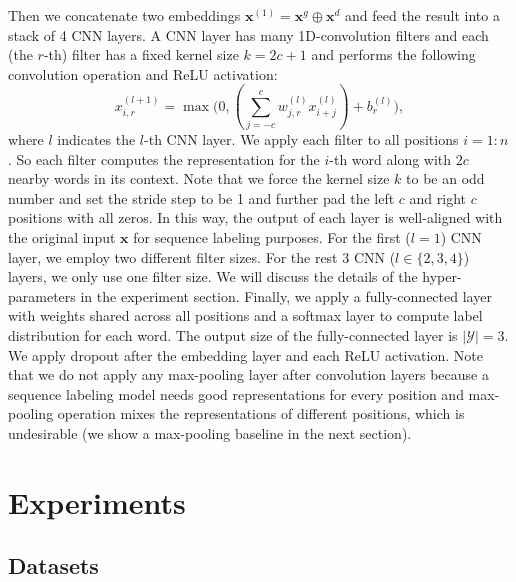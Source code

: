 \documentclass[11pt,a4paper]{article}
\begin{document}
Then we concatenate two embeddings $\mathbf{x}^{(1)}=\mathbf{x}^g \oplus \mathbf{x}^d$ and feed the result into a stack of 4 CNN layers. A CNN layer has many 1D-convolution filters and each (the $r$-th) filter has a fixed kernel size $k=2c+1$ and performs the following convolution operation and ReLU activation: 
\begin{equation}
x_{i,r}^{(l+1)}=\max\bigg(0, (\sum_{j=-c}^c w_{j,r}^{(l)} x_{i+j}^{(l)})+b_r^{(l)}\bigg),
\end{equation}
where $l$ indicates the $l$-th CNN layer. 
We apply each filter to all positions $i=1:n$.
So each filter computes the representation for the $i$-th word along with $2c$ nearby words in its context.  
Note that we force the kernel size $k$ to be an odd number and set the stride step to be 1 and further pad the left $c$ and right $c$ positions with all zeros.  
In this way, the output of each layer is well-aligned with the original input $\mathbf{x}$ for sequence labeling purposes.
For the first ($l=1$) CNN layer, we employ two different filter sizes. 
For the rest 3 CNN ($l \in \{2, 3, 4\}$) layers, we only use one filter size.
We will discuss the details of the hyper-parameters in the experiment section.
Finally, we apply a fully-connected layer with weights shared across all positions and a softmax layer to compute label distribution for each word.
The output size of the fully-connected layer is $|\mathcal{Y}|=3$.
We apply dropout after the embedding layer and each ReLU activation.
Note that we do not apply any max-pooling layer after convolution layers because a sequence labeling model needs good representations for every position and max-pooling operation mixes the representations of different positions, which is undesirable (we show a max-pooling baseline in the next section).

\section{Experiments}

\subsection{Datasets}
\begin{table}[t]
    \label{tab:dataset} 
    \centering
    \caption{Dataset description with the number of sentences(\#S.) and number of aspect terms(\#A.)}
\end{table}
\end{document}
